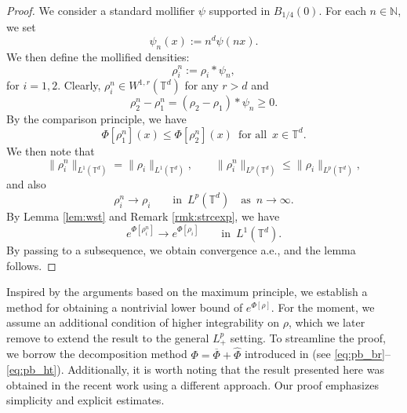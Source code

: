 \documentclass[11pt,reqno,a4paper]{amsart}
\newcommand{\N}{\mathbb{N}}
\theoremstyle{definition}
\theoremstyle{remark}
\numberwithin{equation}{section}
\newcommand{\T} {\mathbb T}
\begin{document}
\begin{proof}
We consider a standard mollifier $\psi$ supported in $B_{1/4}(0)$. For each $n\in \N$, we set
\[
\psi_n(x):= n^d\psi(nx).
\]
We then define the mollified densities:
\[
\rho^n_i:= \rho_i * \psi_n,
\]
for $i=1,2$. Clearly, $\rho^n_i \in W^{1,r}(\T^d)$ for any $r>d$ and
\[
\rho_2^n - \rho_1^n = (\rho_2 - \rho_1)*\psi_n \ge 0.
\]
By the comparison principle, we have
\[
\Phi[\rho_1^n](x) \le \Phi[\rho_2^n](x)\,\,\,\mbox{for all}\,\,\, x \in \T^d.
\]
We then note that
\[
\|\rho^n_i\|_{L^1(\T^d)} = \|\rho_i\|_{L^1(\T^d)},\qquad \|\rho^n_i\|_{L^p(\T^d)} \le \|\rho_i\|_{L^p(\T^d)},
\]
and also
\[
\rho^n_i \to \rho_i \qquad \text{in}\,\,\, L^p(\T^d)\quad \text{as}\,\,\,n\to \infty.
\]
By Lemma \ref{lem:wst} and Remark \ref{rmk:strcexp}, we have 
\[
e^{\Phi[\rho_i^n]} \to e^{\Phi[\rho_i]}\qquad \text{in}\,\,\,L^1(\T^d).
\]
By passing to a subsequence, we obtain convergence a.e., and the lemma follows.
\end{proof}

Inspired by the arguments based on the maximum principle, we establish a method for obtaining a nontrivial lower bound of $e^{\Phi[\rho]}$. For the moment, we assume an additional condition of higher integrability on $\rho$, which we later remove to extend the result to the general $L^p_+$ setting. To streamline the proof, we borrow the decomposition method $\Phi = \overline{\Phi} + \widehat{\Phi}$ introduced in \cite{griffinpickeringiacobelli2021Torus} (see \eqref{eq:pb_br}--\eqref{eq:pb_ht}). Additionally, it is worth noting that the result presented here was obtained in 
the recent work \cite{griffinpickering2024} using a different approach. Our proof emphasizes simplicity and explicit estimates.
\end{document}
